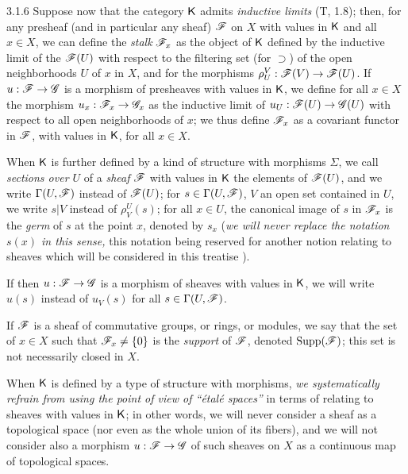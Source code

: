 \documentclass[10pt,oneside]{book}
\begin{document}
\begin{env}{3.1.6}
\label{env-0.3.1.6}
Suppose now that the category $\mathsf{K}$ admits \emph{inductive limits} (T, 1.8); then, for any
presheaf (and in particular any sheaf) $\mathscr{F}$ on $X$ with values in $\mathsf{K}$ and all $x\in X$,
we can define the \emph{stalk} $\mathscr{F}_x$ as the object of $\mathsf{K}$ defined by the inductive
limit of the $\mathscr{F}(U)$ with respect to the filtering set (for $\supset$) of the open
neighborhoods $U$ of $x$ in $X$, and for the morphisms $\rho_U^V:\mathscr{F}(V)\to\mathscr{F}(U)$. If
$u:\mathscr{F}\to\mathscr{G}$ is a morphism of presheaves with values in $\mathsf{K}$, we define for all
$x\in X$ the morphism $u_x:\mathscr{F}_x\to\mathscr{G}_x$ as the inductive limit of
$u_U:\mathscr{F}(U)\to\mathscr{G}(U)$ with respect to all open neighborhoods of $x$; we thus define
$\mathscr{F}_x$ as a covariant functor in $\mathscr{F}$, with values in $\mathsf{K}$, for all $x\in X$.

When $\mathsf{K}$ is further defined by a kind of structure with morphisms $\Sigma$, we call
\emph{sections over $U$} of a \emph{sheaf} $\mathscr{F}$ with values in $\mathsf{K}$ the elements of
$\mathscr{F}(U)$, and we write $\Gamma(U,\mathscr{F})$ instead of $\mathscr{F}(U)$; for
$s\in\Gamma(U,\mathscr{F})$, $V$ an open set contained in $U$, we write $s|V$ instead of
$\rho_V^U(s)$; for all $x\in U$, the canonical image of $s$ in $\mathscr{F}_x$ is the \emph{germ}
of $s$ at the point $x$, denoted by $s_x$ (\emph{we will never replace the notation $s(x)$ in
this sense,} this notation being reserved for another notion relating to sheaves which will
be considered in this treatise ).

If then $u:\mathscr{F}\to\mathscr{G}$ is a morphism of sheaves with values in $\mathsf{K}$, we will write
$u(s)$ instead of $u_V(s)$ for all $s\in\Gamma(U,\mathscr{F})$.

If $\mathscr{F}$ is a sheaf of commutative groups, or rings, or modules, we say that the set of
$x\in X$ such that $\mathscr{F}_x\neq\{0\}$ is the \emph{support} of $\mathscr{F}$, denoted
${\mathop{\mathrm{Supp}}\nolimits}(\mathscr{F})$; this set is not necessarily closed in $X$.

When $\mathsf{K}$ is defined by a type of structure with morphisms, \emph{we systematically refrain
from using the point of view of ``\'etal\'e spaces''} in terms of relating to sheaves with
values in $\mathsf{K}$; in other words, we will never consider a sheaf as a topological space (nor
even as the whole union of its fibers), and we will not consider also a morphism
$u:\mathscr{F}\to\mathscr{G}$ of such sheaves on $X$ as a continuous map of topological spaces.
\end{env}
\end{document}
